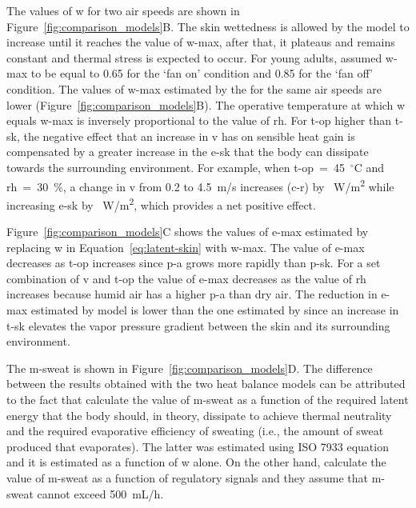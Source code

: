 The values of \ac{w} for two air speeds are shown in Figure~\ref{fig:comparison_models}B\@.
The skin wettedness is allowed by the model to increase until it reaches the value of \ac{w-max}, after that, it plateaus and remains constant and thermal stress is expected to occur.
For young adults,  assumed \ac{w-max} to be equal to 0.65 for the `fan on' condition and 0.85 for the `fan off' condition.
The values of \ac{w-max} estimated by the  for the same air speeds are lower (Figure~\ref{fig:comparison_models}B).
The operative temperature at which \ac{w} equals \ac{w-max} is inversely proportional to the value of \ac{rh}.
For \ac{t-op} higher than \ac{t-sk}, the negative effect that an increase in \ac{v} has on sensible heat gain is compensated by a greater increase in the \acf{e-sk} that the body can dissipate towards the surrounding environment.
For example, when \ac{t-op}~=~45~$^{\circ}$C and \ac{rh}~=~30~\%, a change in \ac{v} from 0.2 to 4.5~m/s increases (\acs{c-r}) by ~W/m\textsuperscript{2} while increasing \ac{e-sk} by ~W/m\textsuperscript{2}, which provides a net positive effect.

Figure~\ref{fig:comparison_models}C shows the values of \ac{e-max} estimated by replacing \ac{w} in Equation~\ref{eq:latent-skin} with \ac{w-max}.
The value of \ac{e-max} decreases as \ac{t-op} increases since \ac{p-a} grows more rapidly than \ac{p-sk}.
For a set combination of \ac{v} and \ac{t-op} the value of \ac{e-max} decreases as the value of \ac{rh} increases because humid air has a higher \ac{p-a} than dry air.
The reduction in \ac{e-max} estimated by  model is lower than the one estimated by  since an increase in \ac{t-sk} elevates the vapor pressure gradient between the skin and its surrounding environment.

The \acf{m-sweat} is shown in Figure~\ref{fig:comparison_models}D\@.
The difference between the results obtained with the two heat balance models can be attributed to the fact that \citeauthor{Jay2015} calculate the value of \ac{m-sweat} as a function of the required latent energy that the body should, in theory, dissipate to achieve thermal neutrality and the required evaporative efficiency of sweating (i.e., the amount of sweat produced that evaporates).
The latter was estimated using ISO 7933 equation and it is estimated as a function of \ac{w} alone.
On the other hand, \citeauthor{GaggeSET} calculate the value of \ac{m-sweat} as a function of regulatory signals and they assume that \ac{m-sweat} cannot exceed 500~mL/h.

